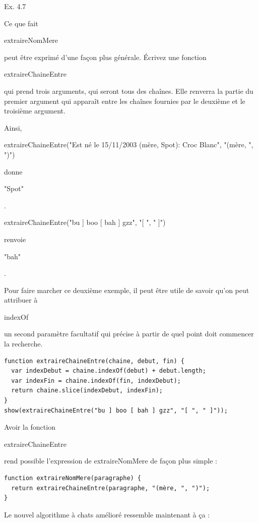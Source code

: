 \documentclass{FramateX}
\renewcommand{\texttt}[1]{\begin{sffamily}{#1}\end{sffamily}}
\begin{document}
\begin{center}\end{center}

Ex. 4.7

Ce que fait \texttt{extraireNomMere} peut être exprimé d'une façon plus
générale. Écrivez une fonction \texttt{extraireChaineEntre} qui prend
trois arguments, qui seront tous des chaînes. Elle renverra la partie du
premier argument qui apparaît entre les chaînes fournies par le deuxième
et le troisième argument.

Ainsi,
\texttt{extraireChaineEntre("Est né le 15/11/2003 (mère, Spot): Croc Blanc", "(mère, ", ")")}
donne \texttt{"Spot"}.

\texttt{extraireChaineEntre("bu {]} boo {[} bah {]} gzz", "{[} ", " {]}")}
renvoie \texttt{"bah"}.

Pour faire marcher ce deuxième exemple, il peut être utile de savoir
qu'on peut attribuer à \texttt{indexOf} un second paramètre facultatif
qui précise à partir de quel point doit commencer la recherche.

\begin{lstlisting}
function extraireChaineEntre(chaine, debut, fin) {
  var indexDebut = chaine.indexOf(debut) + debut.length;
  var indexFin = chaine.indexOf(fin, indexDebut);
  return chaine.slice(indexDebut, indexFin);
}
show(extraireChaineEntre("bu ] boo [ bah ] gzz", "[ ", " ]"));
\end{lstlisting}
\begin{center}\end{center}

Avoir la fonction \texttt{extraireChaineEntre} rend possible
l'expression de extraireNomMere de façon plus simple :

\begin{lstlisting}
function extraireNomMere(paragraphe) {
  return extraireChaineEntre(paragraphe, "(mère, ", ")");
}
\end{lstlisting}
\begin{center}\end{center}

Le nouvel algorithme à chats amélioré ressemble maintenant à ça :
\end{document}
